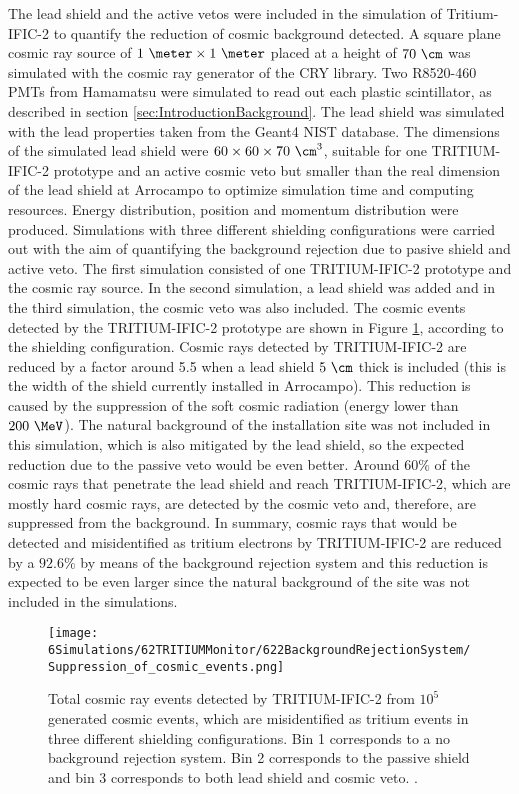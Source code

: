The lead shield and the active vetos were included in the simulation of Tritium-IFIC-2 to quantify the reduction of cosmic background detected. A square plane cosmic ray source of $1~\meter \times 1~\meter$ placed at a height of $70~\cm$ was simulated with the cosmic ray generator of the CRY library. Two R8520-460 PMTs from Hamamatsu were simulated to read out each plastic scintillator, as described in section \ref{sec:IntroductionBackground}. The lead shield was simulated with the lead properties taken from the Geant4 NIST database. The dimensions of the simulated lead shield were $60 \times 60 \times 70~\cm^3$, suitable for one TRITIUM-IFIC-2 prototype and an active cosmic veto but smaller than the real dimension of the lead shield at Arrocampo to optimize simulation time and computing resources. Energy distribution, position and momentum distribution were produced. Simulations with three different shielding configurations were carried out with the aim of quantifying the background rejection due to pasive shield and active veto. The first simulation consisted of one TRITIUM-IFIC-2 prototype and the cosmic ray source. In the second simulation, a lead shield was added and in the third simulation, the cosmic veto was also included. The cosmic events detected by the TRITIUM-IFIC-2 prototype are shown in Figure \ref{fig:CosmicEventsSuppressionSimulated}, according to the shielding configuration. Cosmic rays detected by TRITIUM-IFIC-2 are reduced by a factor around 5.5 when a lead shield $5~\cm$ thick is included (this is the width of the shield currently installed in Arrocampo). This reduction is caused by the suppression of the soft cosmic radiation (energy lower than $200~\MeV$). The natural background of the installation site was not included in this simulation, which is also mitigated by the lead shield, so the expected reduction due to the passive veto would be even better. Around $60\%$ of the cosmic rays that penetrate the lead shield and reach TRITIUM-IFIC-2, which are mostly hard cosmic rays, are detected by the cosmic veto and, therefore, are suppressed from the background. In summary, cosmic rays that would be detected and misidentified as tritium electrons by TRITIUM-IFIC-2 are reduced by a $92.6\%$ by means of the background rejection system and this reduction is expected to be even larger since the natural background of the site was not included in the simulations.

\begin{figure}[h]
\texttt{[image: 6Simulations/62TRITIUMMonitor/622BackgroundRejectionSystem/Suppression\_of\_cosmic\_events.png]}
\centering
\caption{Total cosmic ray events detected by TRITIUM-IFIC-2 from $10^5$ generated cosmic events, which are misidentified as tritium events in three different shielding configurations. Bin 1 corresponds to a no background rejection system. Bin 2 corresponds to the passive shield and bin 3 corresponds to both lead shield and cosmic veto.  \label{fig:CosmicEventsSuppressionSimulated}.}
\end{figure}